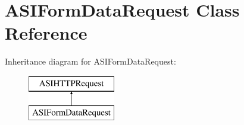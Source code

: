 \hypertarget{interface_a_s_i_form_data_request}{
\section{ASIFormDataRequest Class Reference}
\label{interface_a_s_i_form_data_request}
}
Inheritance diagram for ASIFormDataRequest:\begin{figure}[H]
\begin{center}
\leavevmode
\includegraphics[height=2.000000cm]{interface_a_s_i_form_data_request}
\end{center}
\end{figure}
